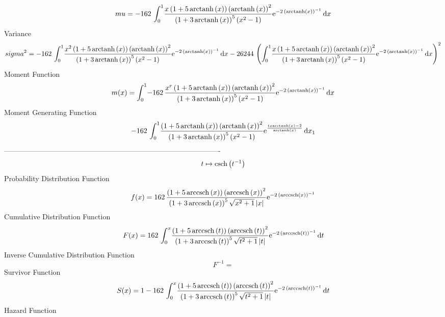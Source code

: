 \documentclass[12pt]{article}
\begin{document}
 $$ mu=-162\,\int_{0}^{1}\!{\frac {x \left( 1+5\,{\rm arctanh} \left(x\right)
 \right)  \left( {\rm arctanh} \left(x\right) \right) ^{2}}{ \left( 1+
3\,{\rm arctanh} \left(x\right) \right) ^{5} \left( {x}^{2}-1 \right) 
}{{\rm e}^{-2\, \left( {\rm arctanh} \left(x\right) \right) ^{-1}}}}
\,{\rm d}x
$$ Variance 
 $$ sigma^2 = -162\,\int_{0}^{1}\!{\frac {{x}^{2} \left( 1+5\,{\rm arctanh} \left(x
\right) \right)  \left( {\rm arctanh} \left(x\right) \right) ^{2}}{
 \left( 1+3\,{\rm arctanh} \left(x\right) \right) ^{5} \left( {x}^{2}-
1 \right) }{{\rm e}^{-2\, \left( {\rm arctanh} \left(x\right) \right) 
^{-1}}}}\,{\rm d}x-26244\, \left( \int_{0}^{1}\!{\frac {x \left( 1+5\,
{\rm arctanh} \left(x\right) \right)  \left( {\rm arctanh} \left(x
\right) \right) ^{2}}{ \left( 1+3\,{\rm arctanh} \left(x\right)
 \right) ^{5} \left( {x}^{2}-1 \right) }{{\rm e}^{-2\, \left( 
{\rm arctanh} \left(x\right) \right) ^{-1}}}}\,{\rm d}x \right) ^{2}
$$Moment Function 
 $$ m(x) = \int_{0}^{1}\!-162\,{\frac {{x}^{r} \left( 1+5\,{\rm arctanh} \left(x
\right) \right)  \left( {\rm arctanh} \left(x\right) \right) ^{2}}{
 \left( 1+3\,{\rm arctanh} \left(x\right) \right) ^{5} \left( {x}^{2}-
1 \right) }{{\rm e}^{-2\, \left( {\rm arctanh} \left(x\right) \right) 
^{-1}}}}\,{\rm d}x
$$ Moment Generating Function 
 $$-162\,\int_{0}^{1}\!{\frac { \left( 1+5\,{\rm arctanh} \left(x\right)
 \right)  \left( {\rm arctanh} \left(x\right) \right) ^{2}}{ \left( 1+
3\,{\rm arctanh} \left(x\right) \right) ^{5} \left( {x}^{2}-1 \right) 
}{{\rm e}^{{\frac {tx{\rm arctanh} \left(x\right)-2}{{\rm arctanh} 
\left(x\right)}}}}}\,{\rm d}x_{{1}}
$$-------------------------------------------------------------------------------------------  \\$$t\mapsto {\rm csch} \left({t}^{-1}\right)
$$Probability Distribution Function 
$$  f(x)=162\,{\frac { \left( 1+5\,{\rm arccsch} \left(x\right) \right) 
 \left( {\rm arccsch} \left(x\right) \right) ^{2}}{ \left( 1+3\,
{\rm arccsch} \left(x\right) \right) ^{5}\sqrt {{x}^{2}+1} \left| x
 \right| }{{\rm e}^{-2\, \left( {\rm arccsch} \left(x\right) \right) ^
{-1}}}}
$$Cumulative Distribution Function  
 $$F(x)=162\,\int_{0}^{x}\!{\frac { \left( 1+5\,{\rm arccsch} \left(t\right)
 \right)  \left( {\rm arccsch} \left(t\right) \right) ^{2}}{ \left( 1+
3\,{\rm arccsch} \left(t\right) \right) ^{5}\sqrt {{t}^{2}+1} \left| t
 \right| }{{\rm e}^{-2\, \left( {\rm arccsch} \left(t\right) \right) ^
{-1}}}}\,{\rm d}t
$$ Inverse Cumulative Distribution Function 
  $$F^{-1} = $$Survivor Function 
 $$ S(x)=1-162\,\int_{0}^{x}\!{\frac { \left( 1+5\,{\rm arccsch} \left(t\right)
 \right)  \left( {\rm arccsch} \left(t\right) \right) ^{2}}{ \left( 1+
3\,{\rm arccsch} \left(t\right) \right) ^{5}\sqrt {{t}^{2}+1} \left| t
 \right| }{{\rm e}^{-2\, \left( {\rm arccsch} \left(t\right) \right) ^
{-1}}}}\,{\rm d}t
$$ Hazard Function 
\end{document}
